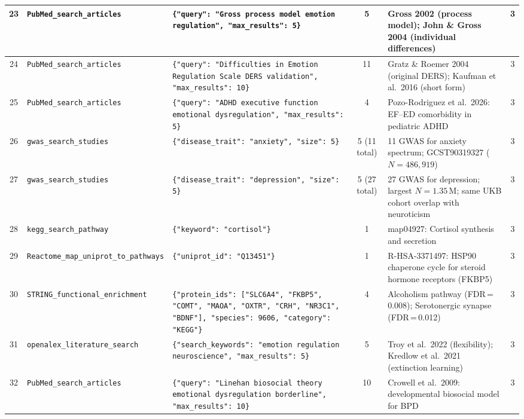 \begin{longtable}{@{}c p{2.6cm} p{5.2cm} c p{3.8cm} c@{}}
23 &
\texttt{PubMed\_search\_\allowbreak articles} &
\texttt{\{"query": "Gross process model emotion regulation", "max\_results": 5\}} &
5 &
Gross 2002 (process model); John \& Gross 2004 (individual differences) &
3 \\
\midrule

24 &
\texttt{PubMed\_search\_\allowbreak articles} &
\texttt{\{"query": "Difficulties in Emotion Regulation Scale DERS validation", "max\_results": 10\}} &
11 &
Gratz \& Roemer 2004 (original DERS); Kaufman et al.\ 2016 (short form) &
3 \\
\midrule

25 &
\texttt{PubMed\_search\_\allowbreak articles} &
\texttt{\{"query": "ADHD executive function emotional dysregulation", "max\_results": 5\}} &
4 &
Pozo-Rodriguez et al.\ 2026: EF--ED comorbidity in pediatric ADHD &
3 \\
\midrule

26 &
\texttt{gwas\_search\_\allowbreak studies} &
\texttt{\{"disease\_trait": "anxiety", "size": 5\}} &
5 (11 total) &
11 GWAS for anxiety spectrum; GCST90319327 ($N{=}486{,}919$) &
3 \\
\midrule

27 &
\texttt{gwas\_search\_\allowbreak studies} &
\texttt{\{"disease\_trait": "depression", "size": 5\}} &
5 (27 total) &
27 GWAS for depression; largest $N{=}1.35$\,M; same UKB cohort overlap with neuroticism &
3 \\
\midrule

28 &
\texttt{kegg\_search\_\allowbreak pathway} &
\texttt{\{"keyword": "cortisol"\}} &
1 &
map04927: Cortisol synthesis and secretion &
3 \\
\midrule

29 &
\texttt{Reactome\_map\_\allowbreak uniprot\_to\_\allowbreak pathways} &
\texttt{\{"uniprot\_id": "Q13451"\}} &
1 &
R-HSA-3371497: HSP90 chaperone cycle for steroid hormone receptors (FKBP5) &
3 \\
\midrule

30 &
\texttt{STRING\_functional\_\allowbreak enrichment} &
\texttt{\{"protein\_ids": ["SLC6A4", "FKBP5", "COMT", "MAOA", "OXTR", "CRH", "NR3C1", "BDNF"], "species": 9606, "category": "KEGG"\}} &
4 &
Alcoholism pathway (FDR\,=\,0.008); Serotonergic synapse (FDR\,=\,0.012) &
3 \\
\midrule

31 &
\texttt{openalex\_literature\_\allowbreak search} &
\texttt{\{"search\_keywords": "emotion regulation neuroscience", "max\_results": 5\}} &
5 &
Troy et al.\ 2022 (flexibility); Kredlow et al.\ 2021 (extinction learning) &
3 \\
\midrule

32 &
\texttt{PubMed\_search\_\allowbreak articles} &
\texttt{\{"query": "Linehan biosocial theory emotional dysregulation borderline", "max\_results": 10\}} &
10 &
Crowell et al.\ 2009: developmental biosocial model for BPD &
3 \\

\end{longtable}
\normalsize

